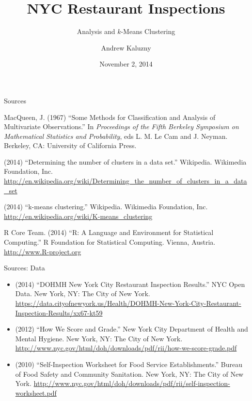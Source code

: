 \documentclass[12pt]{beamer}
\title[NYC Restaurant Inspections]{NYC Restaurant Inspections}
\subtitle{Analysis and $k$-Means Clustering}
\author{Andrew Kaluzny}
\date{November 2, 2014}
\begin{document}
\maketitle

\begin{frame}{Sources}
\begin{itemize}
	\small{
	\item MacQueen, J. (1967) ``Some Methods for Classification and 
		Analysis of Multivariate Observations.'' In \emph{Proceedings of 
		the Fifth Berkeley Symposium on Mathematical Statistics and Probability},
		eds L. M. Le Cam and J. Neyman. Berkeley, CA: University of California Press.
		
	\item (2014) ``Determining the number of clusters in a data set.'' Wikipedia.
		Wikimedia Foundation, Inc. 
		\url{http://en.wikipedia.org/wiki/Determining_the_number_of_clusters_in_a_data_set}
		
	\item (2014) ``k-means clustering.'' Wikipedia.
		Wikimedia Foundation, Inc. 
		\url{http://en.wikipedia.org/wiki/K-means_clustering}
		
	\item R Core Team. (2014) ``R: A Language and Environment for Statistical Computing.''
		R Foundation for Statistical Computing. Vienna, Austria.
		\url{http://www.R-project.org}
	}
\end{itemize}
\end{frame}

\begin{frame}{Sources: Data}
\begin{itemize}
	\item (2014) ``DOHMH New York City Restaurant Inspection Results.''
		NYC Open Data. New York, NY: The City of New York.
		\url{https://data.cityofnewyork.us/Health/DOHMH-New-York-City-Restaurant-Inspection-Results/xx67-kt59}
	
	\item (2012) ``How We Score and Grade.'' New York City Department of Health and
		Mental Hygiene. New York, NY: The City of New York.
		\url{http://www.nyc.gov/html/doh/downloads/pdf/rii/how-we-score-grade.pdf}
		
	\item (2010) ``Self-Inspection Worksheet for Food Service Establishments.''
		Bureau of Food Safety and Community Sanitation. New York, NY: The City of 
		New York.
		\url{http://www.nyc.gov/html/doh/downloads/pdf/rii/self-inspection-worksheet.pdf}
\end{itemize}
\end{frame}
\end{document}
